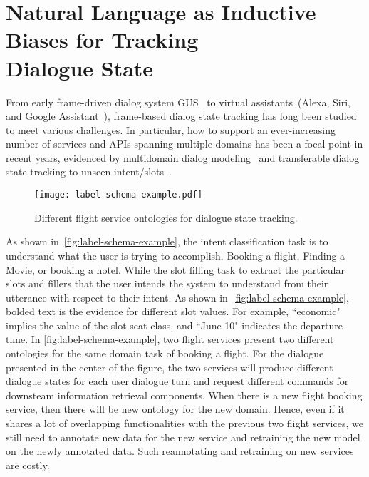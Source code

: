 \chapter[Natural Language as Inductive Biases for Tracking \\Dialogue State]{Natural Language as Inductive \\Biases for Tracking \\Dialogue State}
\label{chap:sgd}

From early frame-driven dialog system GUS~\citep{bobrow1977gus} to
virtual assistants~(Alexa, Siri, and Google Assistant~\etal),
frame-based dialog state tracking has long been studied to meet
various challenges. In particular, how to support an ever-increasing
number of services and APIs spanning multiple domains has been a focal
point in recent years, evidenced by multidomain dialog
modeling~\citep{budzianowski2018multiwoz,byrne2019taskmaster,
  shah-etal-2018-bootstrapping} and transferable dialog state tracking
to unseen intent/slots~\cite{mrkvsic2017neural,
  wu2019transferable, hosseini2020simple}.

\begin{figure}[!th]
\centering
\texttt{[image: label-schema-example.pdf]}
\caption{\label{fig:label-schema-example} Different flight service
  ontologies for dialogue state tracking.}
\end{figure}

As shown in~\autoref{fig:label-schema-example}, the intent
classification task is to understand what the user is trying to
accomplish. Booking a flight, Finding a Movie, or booking a
hotel. While the slot filling task to extract the particular slots and
fillers that the user intends the system to understand from their
utterance with respect to their intent. As shown
in~\autoref{fig:label-schema-example}, bolded text is the evidence for
different slot values. For example, ``economic" implies the value of
the slot seat class, and ``June 10" indicates the departure time. In
\autoref{fig:label-schema-example}, two flight services present two
different ontologies for the same domain task of booking a flight. For
the dialogue presented in the center of the figure, the two services
will produce different dialogue states for each user dialogue turn and
request different commands for downsteam information retrieval
components. When there is a new flight booking service, then there
will be new ontology for the new domain. Hence, even if it shares a
lot of overlapping functionalities with the previous two flight
services, we still need to annotate new data for the new service and
retraining the new model on the newly annotated data. Such
reannotating and retraining on new services are costly.

